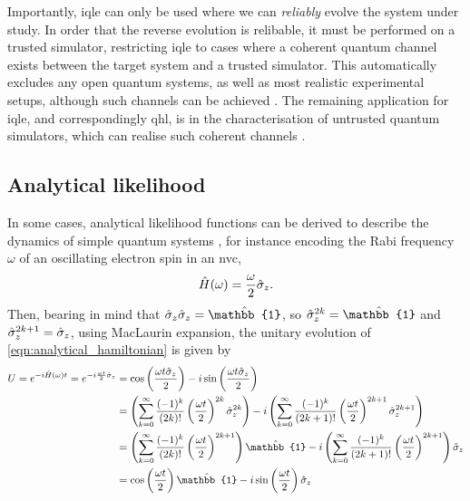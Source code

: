 Importantly, \gls{iqle} can only be used where we can \emph{reliably} evolve the system under study. 
In order that the reverse evolution is relibable, it must be performed on a trusted simulator, 
    restricting \gls{iqle} to cases where a coherent quantum channel exists between the target
    system and a trusted simulator. 
This automatically excludes any open quantum systems, as well as most realistic 
    experimental setups, although such channels can be achieved \cite{hensen2015loophole}. 
The remaining application for \gls{iqle}, and correspondingly \gls{qhl}, 
    is in the characterisation of untrusted quantum simulators, 
    which can realise such coherent channels \cite{wang2017experimental}. 

\subsection{Analytical likelihood}    
In some cases, analytical likelihood functions can be derived to describe the dynamics of simple quantum systems 
    \cite{sergeevich2011characterization, ferrie2013best},
    for instance encoding the Rabi frequency $\omega$ of an oscillating electron spin in an \gls{nvc},
    \begin{equation}
        \label{eqn:analytical_hamiltonian}
        \hat{H}(\omega) = \frac{\omega}{2} \hat{\sigma}_z.
    \end{equation}
Then, bearing in mind that $\s_z \s_z = \hat{\mathbb{1}}$, so $\s_z^{2k}=\hat{\mathbb{1}}$ and $\hat{\sigma}_z^{2k+1} = \hat{\sigma}_z$, 
    using MacLaurin expansion, the unitary evolution of \cref{eqn:analytical_hamiltonian} is given by 
\begin{align}
    \begin{split}
        U = e^{-i \hat{H}(\omega)t} = e^{-i \frac{\omega t}{2} \s_z}  
        &= \cos\bk{ \frac{\omega t \s_z}{2}} 
        - i \sin\bk{ \frac{\omega t \s_z}{2}} \\
        &= \bk{ \sum\limits_{k=0}^{\infty} \frac{(-1)^k}{(2k)!} \bk{ \frac{\omega t}{2} }^{2k} \s_z^{2k}  }
        - i \bk{\sum\limits_{k=0}^{\infty} \frac{(-1)^k}{(2k+1)!} \bk{ \frac{\omega t}{2} }^{2k+1} \s_z^{2k+1}} \\
        &=  \bk{\sum\limits_{k=0}^{\infty} \frac{(-1)^k}{(2k)!} \bk{ \frac{\omega t}{2} }^{2k+1}} \hat{\mathbb{1}} 
        - i \bk{\sum\limits_{k=0}^{\infty} \frac{(-1)^k}{(2k+1)!} \bk{ \frac{\omega t}{2} }^{2k+1} } \s_z \\
        &= \cos\bk{\frac{\omega t}{2}}\hat{\mathbb{1}} - i \sin\bk{\frac{\omega t}{2}} \s_z
    \end{split}
\end{align}
    
